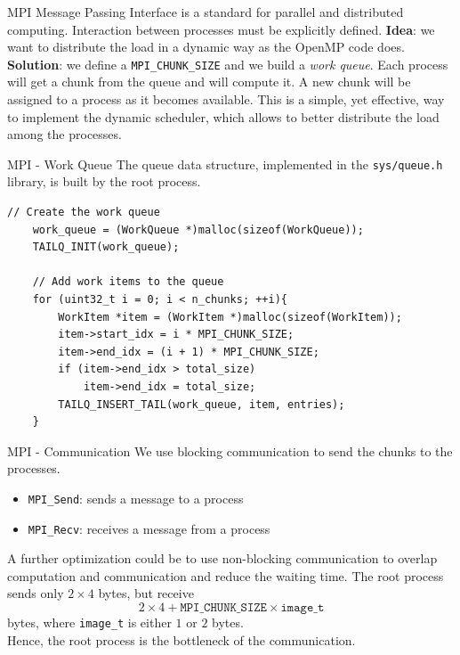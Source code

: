 %
%
\begin{frame}[fragile,t]{MPI}
    Message Passing Interface is a standard for parallel and distributed
    computing. Interaction between processes must be explicitly defined.
    \textbf{Idea}: we want to distribute the load in a dynamic way as
    the OpenMP code does. \\
    \textbf{Solution}: we define a \texttt{MPI\_CHUNK\_SIZE} and we build
    a \textit{work queue}. Each process will get a chunk from the queue
    and will compute it. A new chunk will be assigned to a process
    as it becomes available.
    \newline
    This is a simple, yet effective, way to implement the dynamic scheduler,
    which allows to better distribute the load among the processes.
\end{frame}
\begin{frame}[fragile,t]{MPI - Work Queue}
    The queue data structure, implemented in the \texttt{sys/queue.h} library,
    is built by the root process.
    \begin{lstlisting}[style=customc, basicstyle=\fontsize{7}{7}\selectfont\ttfamily]
    // Create the work queue
    work_queue = (WorkQueue *)malloc(sizeof(WorkQueue));
    TAILQ_INIT(work_queue);

    // Add work items to the queue
    for (uint32_t i = 0; i < n_chunks; ++i){
        WorkItem *item = (WorkItem *)malloc(sizeof(WorkItem));
        item->start_idx = i * MPI_CHUNK_SIZE;
        item->end_idx = (i + 1) * MPI_CHUNK_SIZE;
        if (item->end_idx > total_size)
            item->end_idx = total_size;
        TAILQ_INSERT_TAIL(work_queue, item, entries);
    }
    \end{lstlisting}
\end{frame}
\begin{frame}[fragile,t]{MPI - Communication}
    We use blocking communication to send the chunks to the processes.
    \begin{itemize}
        \item \texttt{MPI\_Send}: sends a message to a process
        \item \texttt{MPI\_Recv}: receives a message from a process
    \end{itemize}
    A further optimization could be to use non-blocking communication
    to overlap computation and communication and reduce the waiting time.
    The root process sends only $2\times4$ bytes, but receive 
    $$2\times4+\texttt{MPI\_CHUNK\_SIZE}\times\texttt{image\_t}$$
    bytes, where \texttt{image\_t} is either $1$ or $2$ bytes. \\
    Hence, the root process is the bottleneck of the communication.

\end{frame}
